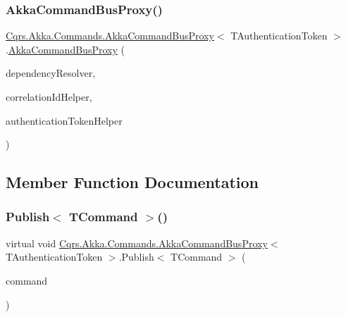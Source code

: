 \subsubsection{\texorpdfstring{Akka\+Command\+Bus\+Proxy()}{AkkaCommandBusProxy()}}
{\footnotesize\ttfamily \hyperlink{classCqrs_1_1Akka_1_1Commands_1_1AkkaCommandBusProxy}{Cqrs.\+Akka.\+Commands.\+Akka\+Command\+Bus\+Proxy}$<$ T\+Authentication\+Token $>$.\hyperlink{classCqrs_1_1Akka_1_1Commands_1_1AkkaCommandBusProxy}{Akka\+Command\+Bus\+Proxy} (\begin{DoxyParamCaption}\item[{\hyperlink{interfaceCqrs_1_1Configuration_1_1IDependencyResolver}{I\+Dependency\+Resolver}}]{dependency\+Resolver,  }\item[{I\+Correlation\+Id\+Helper}]{correlation\+Id\+Helper,  }\item[{\hyperlink{interfaceCqrs_1_1Authentication_1_1IAuthenticationTokenHelper}{I\+Authentication\+Token\+Helper}$<$ T\+Authentication\+Token $>$}]{authentication\+Token\+Helper }\end{DoxyParamCaption})}



\subsection{Member Function Documentation}
\mbox{\label{classCqrs_1_1Akka_1_1Commands_1_1AkkaCommandBusProxy_a410c0fe52016d04de950b1ae767d2ccb_a410c0fe52016d04de950b1ae767d2ccb}} 
\subsubsection{\texorpdfstring{Publish$<$ T\+Command $>$()}{Publish< TCommand >()}\hspace{0.1cm}{\footnotesize\ttfamily [1/2]}}
{\footnotesize\ttfamily virtual void \hyperlink{classCqrs_1_1Akka_1_1Commands_1_1AkkaCommandBusProxy}{Cqrs.\+Akka.\+Commands.\+Akka\+Command\+Bus\+Proxy}$<$ T\+Authentication\+Token $>$.Publish$<$ T\+Command $>$ (\begin{DoxyParamCaption}\item[{T\+Command}]{command }\end{DoxyParamCaption})\hspace{0.3cm}{\ttfamily [virtual]}}



